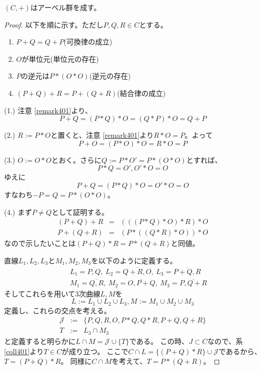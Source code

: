\documentclass[a4]{article}
\begin{document}
        \begin{Them}
            $(C,+)$はアーベル群を成す。
        \end{Them}
        \begin{proof}
            以下を順に示す。ただし$P, Q, R \in C$とする。
            \begin{enumerate}
                \item $P+Q=Q+P$(可換律の成立)
                \item $O$が単位元(単位元の存在)
                \item $P$の逆元は$P \ast (O \ast O)$(逆元の存在)
                \item $(P+Q)+R=P+(Q+R)$(結合律の成立)
            \end{enumerate}

            (1.)
            注意 \ref{remark401}より、
            \[ P+Q=(P \ast Q) \ast O=(Q \ast P) \ast O=Q+P \]

            (2.)
            $R:=P \ast O$と置くと、注意 \ref{remark401}より$R \ast O=P$。よって
            \[ P+O=(P \ast O) \ast O=R \ast O=P \]

            (3.)
            $O:=O \ast O$とおく。さらに$Q:=P \ast O'=P \ast (O \ast O)$とすれば、
            \[ P \ast Q = O', O' \ast O=O \]
            ゆえに
            \[ P+Q=(P \ast Q) \ast O=O' \ast O=O \]
            すなわち$-P=Q=P \ast (O \ast O)$。

            (4.)
            まず$P \neq Q$として証明する。
            \begin{eqnarray*}
                (P+Q)+R &=& (((P \ast Q) \ast O) \ast R) \ast O \\
                P+(Q+R) &=& (P \ast ((Q \ast R) \ast O)) \ast O
            \end{eqnarray*}
            なので示したいことは$(P+Q) \ast R=P \ast (Q+R)$と同値。

            直線$L_1, L_2, L_3$と$M_1, M_2, M_3$を以下のように定義する。
            \begin{eqnarray*}
                &{}&L_1=\overline{P,Q},~ L_2=\overline{Q+R,O},~ L_3=\overline{P+Q,R} \\
                &{}&M_1=\overline{Q,R},~ M_2=\overline{O,P+Q},~ M_3=\overline{P,Q+R}
            \end{eqnarray*}
            そしてこれらを用いて3次曲線$L, M$を
            \[ L:=L_1 \cup L_2 \cup L_3, M:=M_1 \cup M_2 \cup M_3 \]
            定義し、これらの交点を考える。
            \begin{eqnarray*}
                \mathcal{J} &:=& \{P,Q,R,O, P \ast Q, Q \ast R, P+Q, Q+R \} \\
                T &:=& L_3 \cap M_3
            \end{eqnarray*}
            と定義すると明らかに$L \cap M = \mathcal{J} \cup \{T\}$である。
            この時、$J \subset C$なので、系 \ref{coll401}より$T \in C$が成り立つ。
            ここで$C \cap L= \{(P+Q) \ast R \} \cup \mathcal{J}$であるから、$T=(P+Q) \ast R$。
            同様に$C \cap M$を考えて、$T=P \ast (Q+R)$。


\end{proof}
\end{document}
